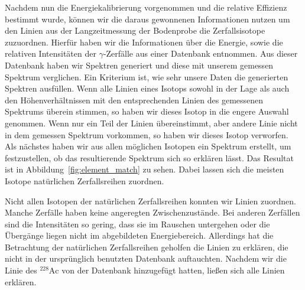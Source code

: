 \documentclass[11pt, ngerman, fleqn, DIV=15, headinclude, BCOR=2cm]{scrreprt}
\begin{document}
Nachdem nun die Energiekalibrierung vorgenommen und die relative
Effizienz bestimmt wurde, können wir die daraus gewonnenen Informationen nutzen
um den Linien aus der Langzeitmessung der Bodenprobe die Zerfallsisotope
zuzuordnen.
Hierfür haben wir die Informationen über die Energie, sowie die relativen
Intensitäten der $\gamma$-Zerfälle aus einer Datenbank
\parencite{IAEA-gamma-ray-database} entnommen.
Aus dieser Datenbank haben wir Spektren generiert und diese mit unserem gemessen
Spektrum verglichen.
Ein Kriterium ist, wie sehr unsere Daten die generierten Spektren
ausfüllen. Wenn alle Linien eines Isotops sowohl in der Lage als auch den
Höhenverhältnissen
mit den entsprechenden Linien des gemessenen Spektrums überein stimmen, so haben
wir dieses Isotop in die engere Auswahl genommen. Wenn nur ein Teil der Linien
übereinstimmt, aber andere Linie nicht in dem gemessen Spektrum vorkommen, so
haben wir dieses Isotop verworfen.
Als nächstes haben wir aus allen möglichen Isotopen ein Spektrum erstellt, um
festzustellen, ob das resultierende Spektrum sich so erklären lässt.
Das Resultat ist in Abbildung~\ref{fig:element_match} zu sehen.
Dabei lassen sich die meisten Isotope natürlichen Zerfallsreihen zuordnen.


Nicht allen Isotopen der natürlichen Zerfallsreihen konnten wir Linien
zuordnen. Manche Zerfälle haben keine angeregten Zwischenzustände. Bei anderen
Zerfällen sind die
Intensitäten so gering, dass sie im Rauschen untergehen oder die Übergänge liegen
nicht im abgebildeten Energiebereich. Allerdings hat die Betrachtung der
natürlichen Zerfallsreihen geholfen die Linien zu erklären, die nicht in der
ursprünglich benutzten Datenbank auftauchten. Nachdem wir die Linie des
$^{228}\text{Ac}$ von \textcite{ac} der Datenbank hinzugefügt hatten, ließen sich alle Linien
erklären. 
\end{document}
